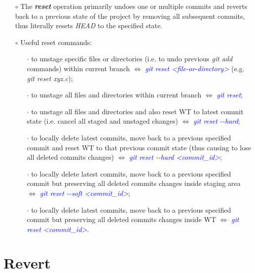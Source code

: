 \documentclass[a4paper,portrait,10pt]{article}   %
\newcommand{\mybulletlvA}{$\circ$}   %
\newcommand{\mybulletlvB}{$\cdot$}   %
\newcommand{\mydiv}{$\Leftrightarrow$ }   %
\newcommand{\mycmd}[1]{\textcolor{blue}{\textit{#1}}}   %
\newcommand{\myvspace}{\vspace{4mm}}   %
\begin{document}
\begin{itemize}
\item[\mybulletlvA] The \textbf{\textit{reset}} operation primarily undoes one or multiple commits and reverts back to a previous state of the project by removing all subsequent commits, thus literally resets \textit{HEAD} to the specified state.
\myvspace

\item[\mybulletlvA] Useful reset commands:
\begin{itemize}
  \item[\mybulletlvB] to unstage specific files or directories (i.e. to undo previous \textit{git add} commands) within current branch \mydiv \mycmd{git reset <file-or-directory>} (e.g. \textit{git reset xyz.c});
  \item[\mybulletlvB] to unstage all files and directories within current branch \mydiv \mycmd{git reset};
  \item[\mybulletlvB] to unstage all files and directories and also reset WT to latest commit state (i.e. cancel all staged and unstaged changes) \mydiv \mycmd{git reset -{}-hard};
  \item[\mybulletlvB] to locally delete latest commits, move back to a previous specified commit and reset WT to that previous commit state (thus causing to lose all deleted commits changes) \mydiv \mycmd{git reset -{}-hard <commit\_id>};
  \item[\mybulletlvB] to locally delete latest commits, move back to a previous specified commit but preserving all deleted commits changes inside staging area \mydiv \mycmd{git reset -{}-soft <commit\_id>};
  \item[\mybulletlvB] to locally delete latest commits, move back to a previous specified commit but preserving all deleted commits changes inside WT \mydiv \mycmd{git reset <commit\_id>}.
\end{itemize}
\end{itemize}
\myvspace


\section{Revert}   \label{sec:Revert}
\end{document}
